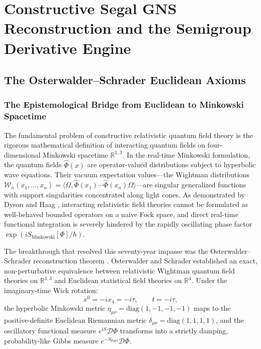 \chapter{Constructive Segal GNS Reconstruction and the Semigroup Derivative Engine}
\label{ch:gns}
\label{ch:constructive_gns_engine}

\section{The Osterwalder--Schrader Euclidean Axioms}
\label{sec:os_axioms_formal}

\subsection{The Epistemological Bridge from Euclidean to Minkowski Spacetime}
\label{subsec:os_epistemological_foundation}

The fundamental problem of constructive relativistic quantum field theory is the rigorous mathematical definition of interacting quantum fields on four-dimensional Minkowski spacetime $\mathbb{R}^{1,3}$. In the real-time Minkowski formulation, the quantum fields $\hat{\Phi}(x)$ are operator-valued distributions subject to hyperbolic wave equations. Their vacuum expectation values—the Wightman distributions $\mathcal{W}_n(x_1, \dots, x_n) = \langle \Omega, \hat{\Phi}(x_1) \cdots \hat{\Phi}(x_n) \Omega \rangle$—are singular generalized functions with support singularities concentrated along light cones. As demonstrated by Dyson \cite{Dyson1952} and Haag \cite{Haag1955}, interacting relativistic field theories cannot be formulated as well-behaved bounded operators on a naive Fock space, and direct real-time functional integration is severely hindered by the rapidly oscillating phase factor $\exp(i S_{\mathrm{Minkowski}}[\Phi] / \hbar)$.

The breakthrough that resolved this seventy-year impasse was the Osterwalder--Schrader reconstruction theorem \cite{OsterwalderSchrader1973, OsterwalderSchrader1975}. Osterwalder and Schrader established an exact, non-perturbative equivalence between relativistic Wightman quantum field theories on $\mathbb{R}^{1,3}$ and Euclidean statistical field theories on $\mathbb{R}^4$. Under the imaginary-time Wick rotation:
\begin{equation}
x^0 = -i x_4 = -i \tau, \qquad t = -i \tau,
\end{equation}
the hyperbolic Minkowski metric $\eta_{\mu\nu} = \mathrm{diag}(1, -1, -1, -1)$ maps to the positive-definite Euclidean Riemannian metric $\delta_{\mu\nu} = \mathrm{diag}(1, 1, 1, 1)$, and the oscillatory functional measure $e^{i S} \mathcal{D}\Phi$ transforms into a strictly damping, probability-like Gibbs measure $e^{-S_{\mathrm{Eucl}}} \mathcal{D}\Phi$.

